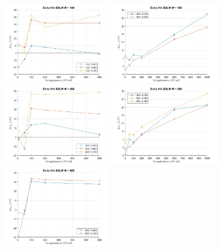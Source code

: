 \documentclass[12pt, letterpaper]{book}
\begin{document}
\begin{figure}[H]
  \centering
  \includegraphics[width=0.49\textwidth]{sovrapposizione-deltaVth-SDLM-N100}
  \includegraphics[width=0.49\textwidth]{sovrapposizione-deltaVth-SDLM-P100}
  \includegraphics[width=0.49\textwidth]{sovrapposizione-deltaVth-SDLM-N200}
  \includegraphics[width=0.49\textwidth]{sovrapposizione-deltaVth-SDLM-P200}
  \includegraphics[width=0.49\textwidth]{sovrapposizione-deltaVth-SDLM-N600}

\end{figure}
\end{document}

